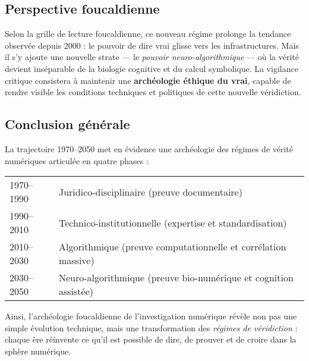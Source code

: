 \documentclass[memoire, 12pt]{report}
\begin{document}
\subsection*{Perspective foucaldienne}
Selon la grille de lecture foucaldienne, ce nouveau régime prolonge la tendance observée depuis 2000 : le pouvoir de dire vrai glisse vers les infrastructures.  
Mais il s’y ajoute une nouvelle strate — le \textit{pouvoir neuro-algorithmique} — où la vérité devient inséparable de la biologie cognitive et du calcul symbolique.  
La vigilance critique consistera à maintenir une \textbf{archéologie éthique du vrai}, capable de rendre visible les conditions techniques et politiques de cette nouvelle véridiction.

\subsection*{Conclusion générale}
La trajectoire 1970–2050 met en évidence une archéologie des régimes de vérité numériques articulée en quatre phases :
\begin{center}
\begin{tabular}{ll}
1970–1990 & Juridico-disciplinaire (preuve documentaire) \\
1990–2010 & Technico-institutionnelle (expertise et standardisation) \\
2010–2030 & Algorithmique (preuve computationnelle et corrélation massive) \\
2030–2050 & Neuro-algorithmique (preuve bio-numérique et cognition assistée)
\end{tabular}
\end{center}

Ainsi, l’archéologie foucaldienne de l’investigation numérique révèle non pas une simple évolution technique, mais une transformation des \textit{régimes de véridiction} : chaque ère réinvente ce qu’il est possible de dire, de prouver et de croire dans la sphère numérique.
\end{document}

